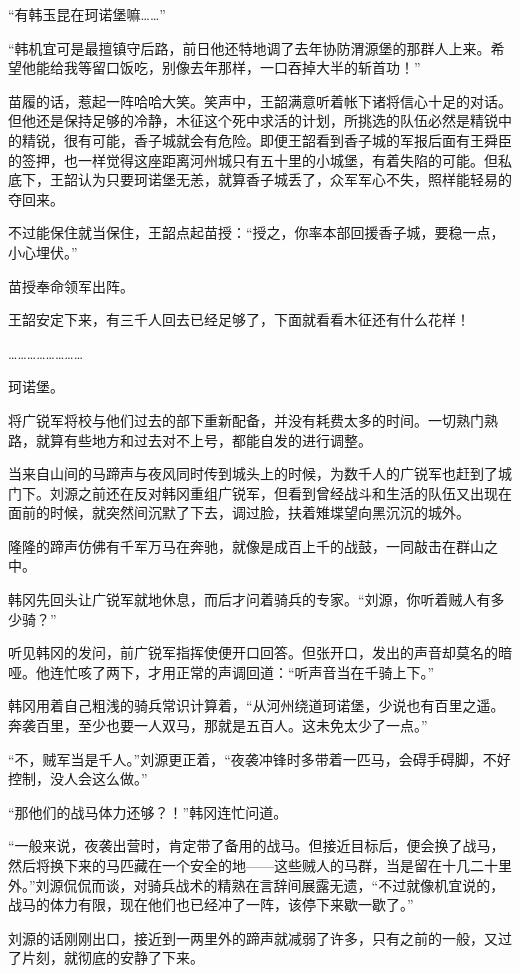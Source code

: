 “有韩玉昆在珂诺堡嘛……”

“韩机宜可是最擅镇守后路，前日他还特地调了去年协防渭源堡的那群人上来。希望他能给我等留口饭吃，别像去年那样，一口吞掉大半的斩首功！”

苗履的话，惹起一阵哈哈大笑。笑声中，王韶满意听着帐下诸将信心十足的对话。但他还是保持足够的冷静，木征这个死中求活的计划，所挑选的队伍必然是精锐中的精锐，很有可能，香子城就会有危险。即便王韶看到香子城的军报后面有王舜臣的签押，也一样觉得这座距离河州城只有五十里的小城堡，有着失陷的可能。但私底下，王韶认为只要珂诺堡无恙，就算香子城丢了，众军军心不失，照样能轻易的夺回来。

不过能保住就当保住，王韶点起苗授：“授之，你率本部回援香子城，要稳一点，小心埋伏。”

苗授奉命领军出阵。

王韶安定下来，有三千人回去已经足够了，下面就看看木征还有什么花样！

……………………

珂诺堡。

将广锐军将校与他们过去的部下重新配备，并没有耗费太多的时间。一切熟门熟路，就算有些地方和过去对不上号，都能自发的进行调整。

当来自山间的马蹄声与夜风同时传到城头上的时候，为数千人的广锐军也赶到了城门下。刘源之前还在反对韩冈重组广锐军，但看到曾经战斗和生活的队伍又出现在面前的时候，就突然间沉默了下去，调过脸，扶着雉堞望向黑沉沉的城外。

隆隆的蹄声仿佛有千军万马在奔驰，就像是成百上千的战鼓，一同敲击在群山之中。

韩冈先回头让广锐军就地休息，而后才问着骑兵的专家。“刘源，你听着贼人有多少骑？”

听见韩冈的发问，前广锐军指挥使便开口回答。但张开口，发出的声音却莫名的暗哑。他连忙咳了两下，才用正常的声调回道：“听声音当在千骑上下。”

韩冈用着自己粗浅的骑兵常识计算着，“从河州绕道珂诺堡，少说也有百里之遥。奔袭百里，至少也要一人双马，那就是五百人。这未免太少了一点。”

“不，贼军当是千人。”刘源更正着，“夜袭冲锋时多带着一匹马，会碍手碍脚，不好控制，没人会这么做。”

“那他们的战马体力还够？！”韩冈连忙问道。

“一般来说，夜袭出营时，肯定带了备用的战马。但接近目标后，便会换了战马，然后将换下来的马匹藏在一个安全的地——这些贼人的马群，当是留在十几二十里外。”刘源侃侃而谈，对骑兵战术的精熟在言辞间展露无遗，“不过就像机宜说的，战马的体力有限，现在他们也已经冲了一阵，该停下来歇一歇了。”

刘源的话刚刚出口，接近到一两里外的蹄声就减弱了许多，只有之前的一般，又过了片刻，就彻底的安静了下来。

